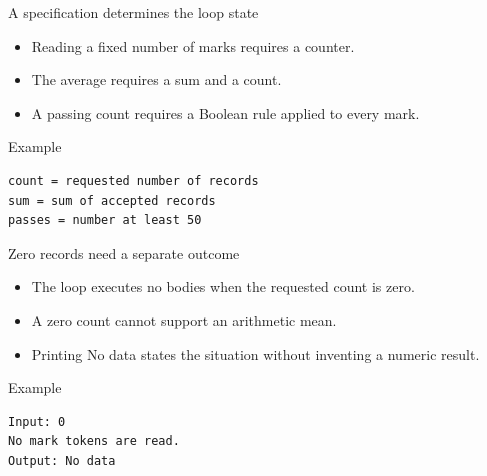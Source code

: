 \documentclass[10pt,aspectratio=169]{beamer}
\begin{document}
\begin{frame}[fragile,t]{A specification determines the loop state}
\begin{itemize}
\item Reading a fixed number of marks requires a counter.
\item The average requires a sum and a count.
\item A passing count requires a Boolean rule applied to every mark.
\end{itemize}
\vspace{1mm}\begin{block}{Example}
\begin{lstlisting}
count = requested number of records
sum = sum of accepted records
passes = number at least 50
\end{lstlisting}
\end{block}
\end{frame}

\begin{frame}[fragile,t]{Zero records need a separate outcome}
\begin{itemize}
\item The loop executes no bodies when the requested count is zero.
\item A zero count cannot support an arithmetic mean.
\item Printing No data states the situation without inventing a numeric result.
\end{itemize}
\vspace{1mm}\begin{block}{Example}
\begin{lstlisting}
Input: 0
No mark tokens are read.
Output: No data
\end{lstlisting}
\end{block}
\end{frame}
\end{document}
